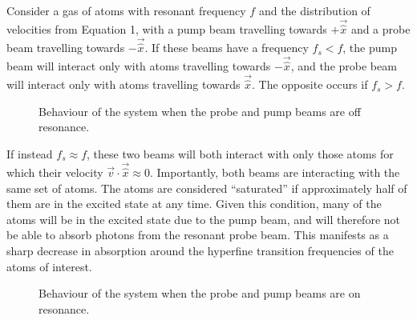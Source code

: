 \documentclass[11pt,twoside,a4paper]{article}
\begin{document}
Consider a gas of atoms with resonant frequency \(f\) and the distribution of velocities from Equation 1, with a pump beam travelling towards \(+\vec{\hat{x}}\) and a probe beam travelling towards \(-\vec{\hat{x}}\). If these beams have a frequency \(f_s<f\), the pump beam will interact only with
atoms travelling towards \(-\vec{\hat{x}}\), and the probe beam will interact only with atoms travelling towards \(\vec{\hat{x}}\). The opposite occurs if \(f_s>f\).
\begin{figure}[h]
    \centering
    \caption{Behaviour of the system when the probe and pump beams are off resonance.}    
\end{figure}

If instead \(f_s\approx f\), these two beams will both interact with only those atoms for which their velocity \(\vec{v}\cdot\vec{\hat{x}}\approx 0\). Importantly, both beams are interacting with the same set of atoms. The atoms are considered ``saturated'' if approximately half of them are in the
excited state at any time. Given this condition, many of the atoms will be in the excited state due to the pump beam, and will therefore not be able to absorb photons from the resonant probe beam. This manifests as a sharp decrease in absorption around the hyperfine transition frequencies of the atoms of interest.
\begin{figure}[h]
    \centering
    \caption{Behaviour of the system when the probe and pump beams are on resonance.}
\end{figure}
\end{document}
